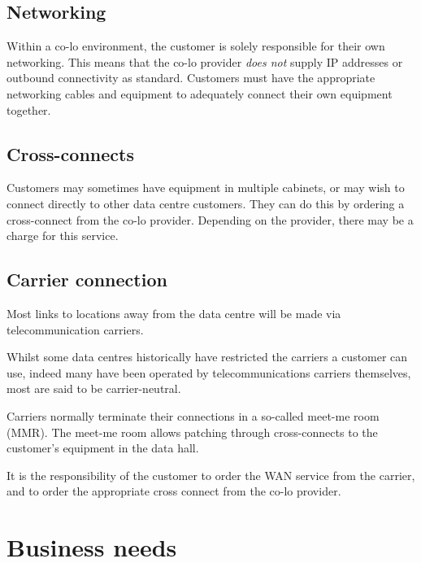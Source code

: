 \documentclass{pgnotes}
\begin{document}
\subsection{Networking}

Within a co-lo environment, the customer is solely responsible for their own networking.
This means that the co-lo provider \textit{does not} supply IP addresses or outbound connectivity as standard.
Customers must have the appropriate networking cables and equipment to adequately connect their own equipment together.

\subsection{Cross-connects}

Customers may sometimes have equipment in multiple cabinets, or may wish to connect directly to other data centre customers.
They can do this by ordering a cross-connect from the co-lo provider.
Depending on the provider, there may be a charge for this service.

\subsection{Carrier connection}

Most links to locations away from the data centre will be made via telecommunication carriers.

Whilst some data centres historically have restricted the carriers a customer can use, indeed many have been operated by telecommunications carriers themselves, most are said to be carrier-neutral.

Carriers normally terminate their connections in a so-called meet-me room (MMR).
The meet-me room allows patching through cross-connects to the customer's equipment in the data hall. 

It is the responsibility of the customer to order the WAN service from the carrier, and to order the appropriate cross connect from the co-lo provider.


\section{Business needs}
\end{document}
